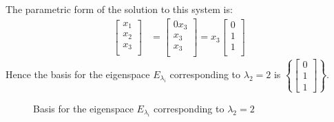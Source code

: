 \documentclass[10pt,letterpaper,final]{report}
\begin{document}
\begin{enumerate}[label=(\alph*)]
\begin{enumerate}
\begin{align*}
\begin{matrix}
                                                         \end{matrix}                                      \\[1ex]
                \end{align*}
                The parametric form of the solution to this system is:
                \begin{align*}
                  \begin{bmatrix}
                    x_1 \\
                    x_2 \\
                    x_3 \\
                  \end{bmatrix} & = \begin{bmatrix}
                                      0x_3 \\
                                      x_3  \\
                                      x_3  \\
                                    \end{bmatrix} = x_3\begin{bmatrix}
                                                         0 \\
                                                         1 \\
                                                         1 \\
                                                       \end{bmatrix}
                \end{align*}
                Hence the basis for the eigenspace $E_{\lambda_i}$ corresponding to $\lambda_2 = 2$ is $\left\{\begin{bmatrix}0\\1\\1\end{bmatrix}\right\}$.
                \begin{figure}[H]
                  \centering
                  \caption{{Basis for the eigenspace $E_{\lambda_i}$ corresponding to $\lambda_2 = 2$}}
                \end{figure}

\end{enumerate}
\end{enumerate}
\end{document}
